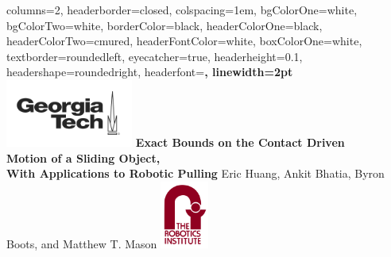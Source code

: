 \documentclass[potrait,paperwidth=20in,paperheight=30in,margin=1.5in,fontscale = 0.5]{baposter} %
\begin{document}
\begin{poster}
{
  columns=2,
  headerborder=closed, %
  colspacing=1em, %
  bgColorOne=white, %
  bgColorTwo=white, %
  borderColor=black, %
  headerColorOne=black, %
  headerColorTwo=cmured,%
  headerFontColor=white, %
  boxColorOne=white, %
  textborder=roundedleft, %
  eyecatcher=true, %
  headerheight=0.1\textheight, %
  headershape=roundedright, %
  headerfont=\large\bf\textsc, %
  linewidth=2pt %
}
%
{\includegraphics[height=6em]{images/gt_logo.png}} %
{\Huge\textbf{Exact Bounds on the Contact Driven \\Motion of a Sliding
    Object,\\\vspace{1mm} With Applications to Robotic Pulling}
  \vspace{3mm}} %
  {{{Eric Huang, Ankit Bhatia, Byron Boots, and Matthew
      T. Mason}}\vspace{3mm}} %
{\includegraphics[height=6em]{images/ri_logo.png}} %

\end{poster}
\end{document}
